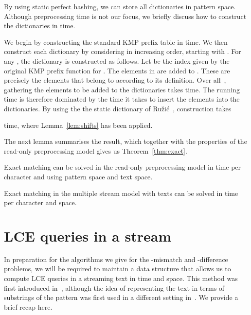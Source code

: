 \documentclass[envcountsame]{llncs}
\begin{document}
By using static perfect hashing, we can store all dictionaries  in  pattern space. Although preprocessing time is not our focus, we briefly discuss how to construct the dictionaries in  time.

We begin by constructing the standard KMP prefix table in  time. We then construct each dictionary  by considering  in increasing order, starting with . For any , the dictionary  is constructed as follows. Let  be the index given by the original KMP prefix function for . The elements in
 are added to . These are precisely the elements that belong to  according to its definition. Over all~, gathering the elements to be added to the dictionaries takes  time. The running time is therefore dominated by the time it takes to insert the elements into the dictionaries. By using the the static dictionary of Ru\v{z}i\'{c}~\cite{Ruzic:08}, construction takes

time, where Lemma~\ref{lem:shifts} has been applied.

The next lemma summarises the result, which together with the properties of the read-only preprocessing model gives us Theorem~\ref{thm:exact}.

\begin{lemma}
    Exact matching can be solved in the read-only preprocessing model in  time per character and using  pattern space and  text space.
\end{lemma}

\begin{theorem}
    \label{thm:exact}
    Exact matching in the multiple stream model with  texts can be solved in  time per character and  space.
\end{theorem}










\section{LCE queries in a stream}\label{sec:lce}

In preparation for the algorithms we give for the -mismatch and
-difference problems, we will be required to maintain a data
structure that allows us to
compute LCE queries in a streaming text in  time  and  space.  This method was first introduced
in~\cite{CS:2010}, although the idea of representing the text in terms of substrings of the pattern was first used in a different
setting in~\cite{ALLS:2007}. We provide a brief recap here.
\end{document}
